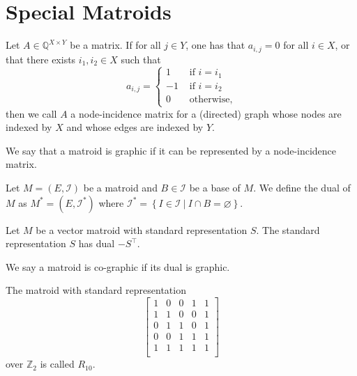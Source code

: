 \chapter{Special Matroids}

\begin{definition}
    \label{Matrix.IsGraphic}
    \leanok
    Let $A \in \mathbb{Q}^{X \times Y}$ be a matrix. If for all $j \in Y$, one has that $a_{i,j} = 0$ for all $i \in X$, or that there exists $i_1,i_2 \in X$ such that
    \[
    a_{i,j} = \begin{cases}
        1 & \text{ if $i = i_1$} \\
        -1 & \text{ if $i = i_2$} \\
        0 & \text{ otherwise},
    \end{cases}
    \]
    then we call $A$ a node-incidence matrix for a (directed) graph whose nodes are indexed by $X$ and whose edges are indexed by $Y$.
\end{definition}

\begin{definition}
    \label{Matroid.IsGraphic}
    \leanok
    We say that a matroid is graphic if it can be represented by a node-incidence matrix.
\end{definition}

\begin{definition}
    \label{Matroid.dualIndepMatroid}
    \leanok
    Let $M = (E, \mathcal{I})$ be a matroid and $B \in \mathcal I$ be a base of $M$. We define the dual of $M$ as $M^* = (E, \mathcal{I}^*)$ where $\mathcal{I}^* = \left\{ I \in \mathcal I  \ | \ I \cap B = \varnothing \right\}.$
\end{definition}

\begin{definition}
    \label{StandardRepr.dual}
    \leanok
    Let $M$ be a vector matroid with standard representation $S$. The standard representation $S$ has dual $-S^\intercal$.
\end{definition}

\begin{definition}
    \label{Matroid.IsCographic}
    \leanok
    We say a matroid is co-graphic if its dual is graphic.
\end{definition}

\begin{definition}
    \label{matroidR10}
    \leanok
    The matroid with standard representation
        \[\begin{bmatrix}
            1 & 0 & 0 & 1 & 1 \\
            1 & 1 & 0 & 0 & 1 \\
            0 & 1 & 1 & 0 & 1 \\
            0 & 0 & 1 & 1 & 1 \\
            1 & 1 & 1 & 1 & 1 \\
        \end{bmatrix}\]
        over $\mathbb{Z}_2$ is called $R_{10}.$
    \end{definition}

